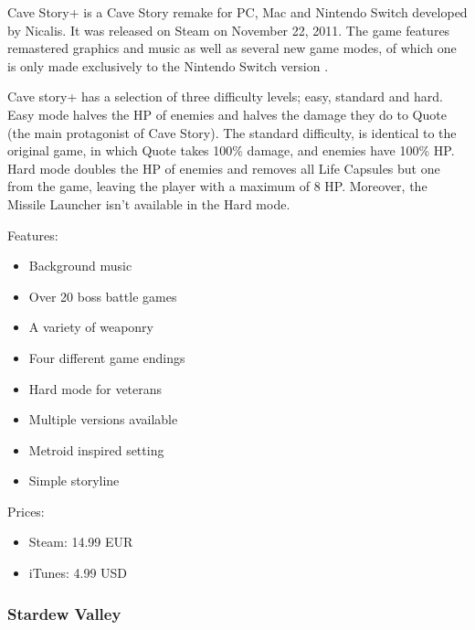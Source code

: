 \documentclass[12p]{article}
\begin{document}
Cave Story+ is a Cave Story remake for PC, Mac and Nintendo Switch developed by Nicalis. It was released on Steam on November 22, 2011. The game features remastered graphics and music as well as several new game modes, of which one is only made exclusively to the Nintendo Switch version \cite{CaveStoryPlusWiki}.

Cave story+ has a selection of three difficulty levels; easy, standard and hard. Easy mode halves the HP of enemies and halves the damage they do to Quote (the main protagonist of Cave Story). The standard difficulty, is identical to the original game, in which Quote takes 100\% damage, and enemies have 100\% HP. Hard mode doubles the HP of enemies and removes all Life Capsules but one from the game, leaving the player with a maximum of 8 HP. Moreover, the Missile Launcher isn't available in the Hard mode.

Features:

\begin{itemize}
  \item Background music
  \item Over 20 boss battle games
  \item A variety of weaponry
  \item Four different game endings
  \item Hard mode for veterans
  \item Multiple versions available
  \item Metroid inspired setting
  \item Simple storyline
\end{itemize}

Prices:

\begin{itemize}
  \item Steam: 14.99 EUR
  \item iTunes: 4.99 USD
\end{itemize}


\subsubsection{Stardew Valley}
\end{document}
